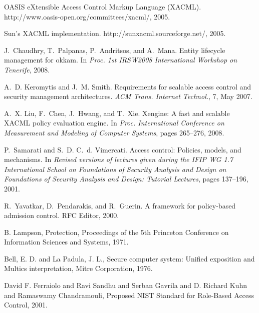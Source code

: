 \documentclass{acm_proc_article-sp}
\begin{document}
%


%
%




%
%
%
%
\nocite{*}
\begin{thebibliography}{1}

{OASIS eXtensible Access Control Markup Language (XACML)}.
{http://www.oasis-open.org/committees/xacml/}, 2005.

{Sun's XACML implementation}.
{http://sunxacml.sourceforge.net/}, 2005.

J.~Chaudhry, T.~Palpanas, P.~Andritsos, and A.~Mana.
 Entity lifecycle management for okkam.
In {\em Proc. 1st IRSW2008 International Workshop on Tenerife}, 2008.

A.~D. Keromytis and J.~M. Smith.
 Requirements for scalable access control and security management
  architectures.
 {\em ACM Trans. Internet Technol.}, 7, May 2007.

A.~X. Liu, F.~Chen, J.~Hwang, and T.~Xie.
 Xengine: A fast and scalable {XACML} policy evaluation engine.
 In {\em Proc. International Conference on Measurement and Modeling of
  Computer Systems}, pages 265--276, 2008.

P.~Samarati and S.~D. C.~d. Vimercati.
 Access control: Policies, models, and mechanisms.
 In {\em Revised versions of lectures given during the IFIP WG 1.7
  International School on Foundations of Security Analysis and Design on
  Foundations of Security Analysis and Design: Tutorial Lectures}, pages
  137--196, 2001.

R.~Yavatkar, D.~Pendarakis, and R.~Guerin.
 A framework for policy-based admission control.
 RFC Editor, 2000.

B. Lampson,
    Protection,
Proceedings of the 5th Princeton Conference on Information Sciences and Systems, 
1971.


Bell, E. D. and La Padula, J. L.,
Secure computer system: Unified exposition and Multics interpretation,
Mitre Corporation,
1976.


David F. Ferraiolo and Ravi Sandhu and Serban Gavrila and D. Richard Kuhn and Ramaswamy Chandramouli,
Proposed NIST Standard for Role-Based Access Control,
2001.



\end{thebibliography}
\end{document}

